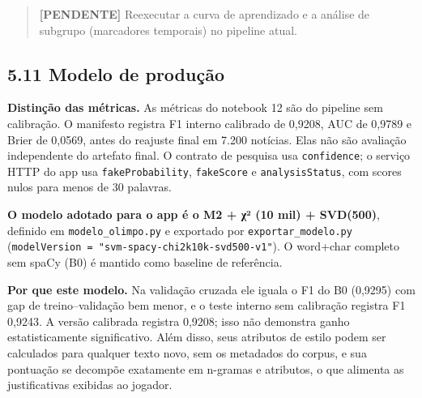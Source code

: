 \documentclass[
  brazilian,
  11pt,
]{article}
\begin{document}
\begin{quote}
\textbf{{[}PENDENTE{]}} Reexecutar a curva de aprendizado e a análise de subgrupo (marcadores temporais) no pipeline atual.
\end{quote}

\subsection{5.11 Modelo de produção}\label{modelo-de-produuxe7uxe3o}

\textbf{Distinção das métricas.} As métricas do notebook 12 são do pipeline sem calibração. O manifesto registra F1 interno calibrado de 0,9208, AUC de 0,9789 e Brier de 0,0569, antes do reajuste final em 7.200 notícias. Elas não são avaliação independente do artefato final. O contrato de pesquisa usa \texttt{confidence}; o serviço HTTP do app usa \texttt{fakeProbability}, \texttt{fakeScore} e \texttt{analysisStatus}, com scores nulos para menos de 30 palavras.


\textbf{O modelo adotado para o app é o M2 + χ² (10 mil) + SVD(500)}, definido em \texttt{modelo\_olimpo.py} e exportado por \texttt{exportar\_modelo.py} (\texttt{modelVersion\ =\ "svm-spacy-chi2k10k-svd500-v1"}). O word+char completo sem spaCy (B0) é mantido como baseline de referência.

\textbf{Por que este modelo.} Na validação cruzada ele iguala o F1 do B0 (0,9295) com gap de treino--validação bem menor, e o teste interno sem calibração registra F1 0,9243. A versão calibrada registra 0,9208; isso não demonstra ganho estatisticamente significativo. Além disso, seus atributos de estilo podem ser calculados para qualquer texto novo, sem os metadados do corpus, e sua pontuação se decompõe exatamente em n-gramas e atributos, o que alimenta as justificativas exibidas ao jogador.
\end{document}
